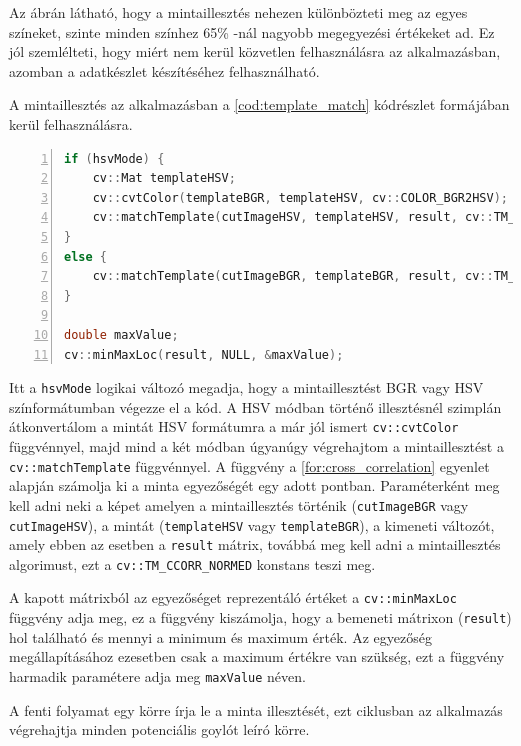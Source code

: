 \par Az ábrán látható, hogy a mintaillesztés nehezen különbözteti meg az egyes színeket, szinte minden színhez 65\% -nál nagyobb megegyezési értékeket ad. Ez jól szemlélteti, hogy miért nem kerül közvetlen felhasználásra az alkalmazásban, azomban a adatkészlet készítéséhez felhasználható.
\par A mintaillesztés az alkalmazásban a \ref{cod:template_match} kódrészlet formájában kerül felhasználásra.

\begin{codewrapper}
\begin{lstlisting}[language=C++, numbers=left, caption={A mintaillesztés menete.}, label={cod:template_match}]
if (hsvMode) {
    cv::Mat templateHSV;
    cv::cvtColor(templateBGR, templateHSV, cv::COLOR_BGR2HSV);
    cv::matchTemplate(cutImageHSV, templateHSV, result, cv::TM_CCORR_NORMED);
}
else {
    cv::matchTemplate(cutImageBGR, templateBGR, result, cv::TM_CCORR_NORMED); 835 -80 722 -25
}

double maxValue;
cv::minMaxLoc(result, NULL, &maxValue);
\end{lstlisting}
\end{codewrapper}

\par Itt a \lstinline{hsvMode} logikai változó megadja, hogy a mintaillesztést BGR vagy HSV színformátumban végezze el a kód. A HSV módban történő illesztésnél szimplán átkonvertálom a mintát HSV formátumra a már jól ismert \lstinline{cv::cvtColor} függvénnyel\cite{opencv_docs}, majd mind a két módban úgyanúgy végrehajtom a mintaillesztést a \lstinline{cv::matchTemplate} függvénnyel\cite{kaehler2016learning,opencv_docs}. A függvény a \ref{for:cross_correlation} egyenlet alapján számolja ki a minta egyezőségét egy adott pontban. Paraméterként meg kell adni neki a képet amelyen a mintaillesztés történik (\lstinline{cutImageBGR} vagy \lstinline{cutImageHSV}), a mintát (\lstinline{templateHSV} vagy \lstinline{templateBGR}), a kimeneti változót, amely ebben az esetben a \lstinline{result} mátrix, továbbá meg kell adni a mintaillesztés algorimust, ezt a \lstinline{cv::TM_CCORR_NORMED} konstans teszi meg.
\par A kapott mátrixból az egyezőséget reprezentáló értéket a \lstinline{cv::minMaxLoc} függvény\cite{opencv_docs} adja meg, ez a függvény kiszámolja, hogy a bemeneti mátrixon (\lstinline{result}) hol található és mennyi a minimum és maximum érték. Az egyezőség megállapításához ezesetben csak a maximum értékre van szükség, ezt a függvény harmadik paramétere adja meg \lstinline{maxValue} néven.
\par A fenti folyamat egy körre írja le a minta illesztését, ezt ciklusban az alkalmazás végrehajtja minden potenciális goylót leíró körre.

